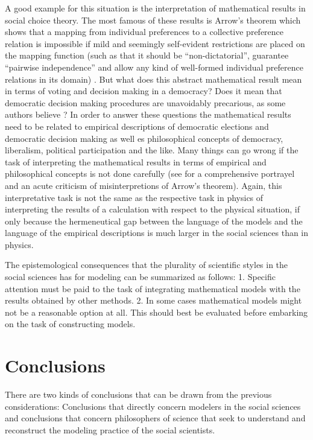 \documentclass[onecollarge]{STJour}
\numberwithin{equation}{section}
\begin{document}
A good example for this situation is the interpretation of mathematical
results in social choice theory. The most famous of these results is
Arrow's theorem which shows that a mapping from individual preferences to
a collective preference relation is impossible if mild and seemingly
self-evident restrictions are placed on the mapping function (such as
that it should be ``non-dictatorial'', guarantee ``pairwise
independence'' and allow any kind of well-formed individual preference
relations in its domain) \citep[p.\ 583ff.]{mueller:2003}. But what does
this abstract mathematical result mean in terms of voting and decision
making in a democracy? Does it mean that democratic decision making
procedures are unavoidably precarious, as some authors believe
\citep{riker:1982}? In order to answer these questions the mathematical
results need to be related to empirical descriptions of democratic
elections and democratic decision making as well es philosophical
concepts of democracy, liberalism, political participation and the like.
Many things can go wrong if the task of interpreting the mathematical
results in terms of empirical and philosophical concepts is not done
carefully (see \citet{mackie:2003} for a comprehensive portrayel and an
acute criticism of misinterpretions of Arrow's theorem). Again, this
interpretative task is not the same as the respective task in physics of
interpreting the results of a calculation with respect to the physical
situation, if only because the hermeneutical gap between the language of
the models and the language of the empirical descriptions is much larger
in the social sciences than in physics.

The epistemological consequences that the plurality of scientific styles
in the social sciences has for modeling can be summarized as follows: 1.
Specific attention must be paid to the task of integrating mathematical
models with the results obtained by other methods. 2. In some cases
mathematical models might not be a reasonable option at all. This should
best be evaluated before embarking on the task of constructing models.


\section{Conclusions}

There are two kinds of conclusions that can be drawn from
the previous considerations: Conclusions that directly concern modelers
in the social sciences and conclusions that concern philosophers of
science that seek to understand and reconstruct the modeling practice
of the social scientists.
\end{document}
